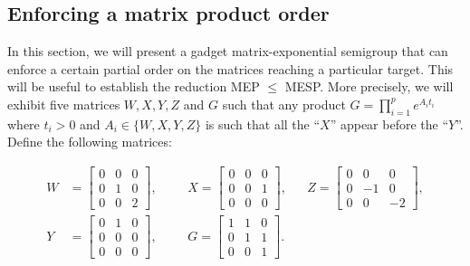 \subsection{Enforcing a matrix product order}
\label{sec:lics_gadget}

In this section, we will present a gadget matrix-exponential semigroup that can
enforce a certain partial order on the matrices reaching a particular target.
This will be useful to establish the reduction MEP $\leq$ MESP\@.
More precisely, we will exhibit five matrices $W,X,Y,Z$ and $G$ such that any
product $G=\prod_{i=1}^{p} e^{A_{i} t_{i}}$
where $t_{i}>0$ and $A_{i}\in \lbrace W,X,Y,Z \rbrace$ is such that all the ``$X$'' appear before
the ``$Y$''. Define the following matrices:

\begin{align*}
W&=\begin{bmatrix}0&0&0\\0&1&0\\0&0&2\end{bmatrix},&&
&X=\begin{bmatrix}0&0&0\\0&0&1\\0&0&0\end{bmatrix},&&
Z=\begin{bmatrix}0&0&0\\0&-1&0\\0&0&-2\end{bmatrix},\\[5pt]
Y&=\begin{bmatrix}0&1&0\\0&0&0\\0&0&0\end{bmatrix},&&
&G=\begin{bmatrix}1&1&0\\0&1&1\\0&0&1\end{bmatrix}.\\
\end{align*}
